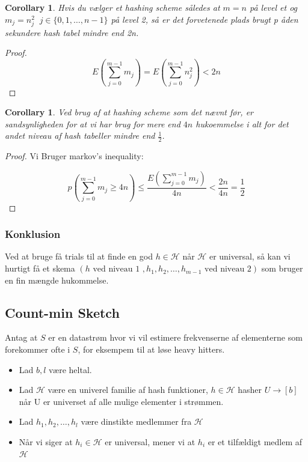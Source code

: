 \documentclass[11pt]{article}
\newtheorem{corollary}[theorem]{Corollary}
\theoremstyle{definition}
\theoremstyle{remark}
\begin{document}
\begin{corollary}
  Hvis du vælger et hashing scheme således at $m = n$ på level et og $m_{j} = n_{j}^{2}\;\;j \in \{0,1, \ldots, n-1\}$ på level 2, så er det forvetenede plads brugt p åden sekundere hash tabel mindre end 2n. 
\end{corollary}

\begin{proof}
\[ E(\sum_{j=0}^{m-1}m_{j}) = E \left( \sum_{j=0}^{m-1}n_{j}^{2} \right) < 2n\]
\end{proof}

\begin{corollary}
Ved brug af at hashing scheme som det nævnt før, er sandsynligheden for at vi har brug for mere end $4n$ hukoemmelse i alt for det andet niveau af hash tabeller mindre end $\frac{1}{2}$.
\end{corollary}

\begin{proof}
  Vi Bruger markov's inequality:


  \begin{equation}
p \left( \sum_{j=0}^{m-1} m_{j} \geq 4n \right) \leq \frac{E \left( \sum_{j=0}^{m-1}m_{j} \right)}{4n} < \frac{2n}{4n} = \frac{1}{2}
  \end{equation}

\end{proof}

\subsubsection{Konklusion}

Ved at bruge få trials til at finde en god $h \in \mathcal{H}$ når $\mathcal{H}$ er universal, så kan vi hurtigt få et skema $(h \text{ ved niveau 1 }, h_{1}, h_{2}, \ldots, h_{m-1} \text{ ved niveau 2})$ som bruger en fin mængde hukommelse.


\subsection{Count-min Sketch}
\label{subsec:count-min-sketch}

Antag at $S$ er en datastrøm hvor vi vil estimere frekvenserne af elementerne som forekommer ofte i $S$, for eksempem til at løse heavy hitters.


\begin{itemize}
\item Lad $b,l$ være heltal.  
\item Lad $\mathcal{H}$ være en univerel familie af hash funktioner, $h \in \mathcal{H}$ hasher $U \rightarrow [b]$ når U er universet af alle mulige elementer i strømmen.
\item Lad $h_{1}, h_{2}, \ldots, h_{l}$ være dinstikte medlemmer fra $\mathcal{H}$
\item Når vi siger at $h_{i} \in \mathcal{H}$ er universal, mener vi at $h_{i}$ er et tilfældigt medlem af $\mathcal{H}$
\end{itemize} 
\end{document}
